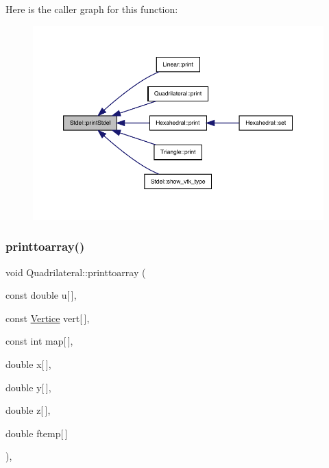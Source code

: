 Here is the caller graph for this function\+:
\nopagebreak
\begin{figure}[H]
\begin{center}
\leavevmode
\includegraphics[width=350pt]{classStdel_a54b5768d09f500cb949e66fc234eac70_icgraph}
\end{center}
\end{figure}
\mbox{\label{classQuadrilateral_a3de7333817e484c45fd98982e69e0a70}} 
\subsubsection{\texorpdfstring{printtoarray()}{printtoarray()}}
{\footnotesize\ttfamily void Quadrilateral\+::printtoarray (\begin{DoxyParamCaption}\item[{const double}]{u\mbox{[}$\,$\mbox{]},  }\item[{const \hyperlink{structVertice}{Vertice}}]{vert\mbox{[}$\,$\mbox{]},  }\item[{const int}]{map\mbox{[}$\,$\mbox{]},  }\item[{double}]{x\mbox{[}$\,$\mbox{]},  }\item[{double}]{y\mbox{[}$\,$\mbox{]},  }\item[{double}]{z\mbox{[}$\,$\mbox{]},  }\item[{double}]{ftemp\mbox{[}$\,$\mbox{]} }\end{DoxyParamCaption})\hspace{0.3cm}{\ttfamily [private]}, {\ttfamily [virtual]}}



